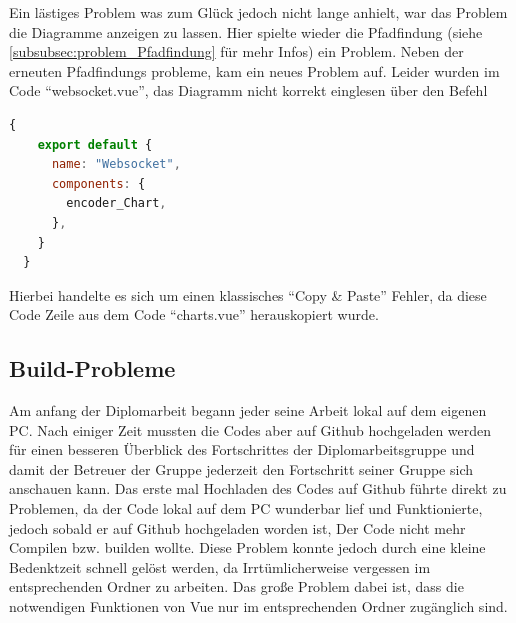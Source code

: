Ein lästiges Problem was zum Glück jedoch nicht lange anhielt, war das Problem die Diagramme anzeigen zu lassen.
Hier spielte wieder die Pfadfindung (siehe \ref{subsubsec:problem_Pfadfindung} für mehr Infos) ein Problem.
%
Neben der erneuten Pfadfindungs probleme, kam ein neues Problem auf. 
Leider wurden im Code ``websocket.vue'', das Diagramm nicht korrekt einglesen über den Befehl
\begin{lstlisting}[language=JavaScript, gobble=4]
  {
    export default {
      name: "Websocket",
      components: {
        encoder_Chart,
      },
    }
  }
\end{lstlisting}
Hierbei handelte es sich um einen klassisches ``Copy \& Paste'' Fehler, da diese Code Zeile aus dem Code
``charts.vue'' herauskopiert wurde.
%

\subsection{Build-Probleme}
\label{subsubsec:problem_Builden}

Am anfang der Diplomarbeit begann jeder seine Arbeit lokal auf dem eigenen PC.
%
Nach einiger Zeit mussten die Codes aber auf Github hochgeladen werden für einen besseren Überblick 
des Fortschrittes der Diplomarbeitsgruppe und damit der Betreuer der Gruppe jederzeit den Fortschritt 
seiner Gruppe sich anschauen kann. 
%
Das erste mal Hochladen des Codes auf Github führte direkt zu Problemen, 
da der Code lokal auf dem PC wunderbar lief und Funktionierte, 
jedoch sobald er auf Github hochgeladen worden ist, 
Der Code nicht mehr Compilen bzw. builden wollte.
%
Diese Problem konnte jedoch durch eine kleine Bedenktzeit schnell gelöst werden,
da Irrtümlicherweise vergessen im entsprechenden Ordner zu arbeiten.
%
Das große Problem dabei ist, dass die notwendigen Funktionen von Vue nur im entsprechenden Ordner zugänglich sind.
%
